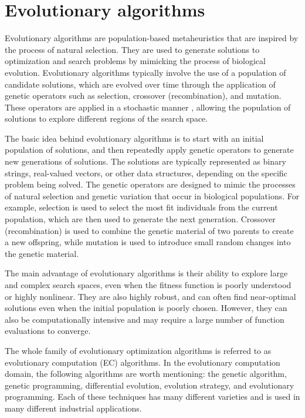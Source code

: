 \documentclass[oneside]{ctuthesis}
\theoremstyle{plain}
\theoremstyle{definition}
\theoremstyle{note}
\begin{document}
\chapter{Evolutionary algorithms}

Evolutionary algorithms are population-based metaheuristics that are inspired by the process of natural selection. They are used to generate solutions to optimization and search problems by mimicking the process of biological evolution. Evolutionary algorithms typically involve the use of a population of candidate solutions, which are evolved over time through the application of genetic operators such as selection, crossover (recombination), and mutation. These operators are applied in a stochastic manner , allowing the population of solutions to explore different regions of the search space.

The basic idea behind evolutionary algorithms is to start with an initial population of solutions, and then repeatedly apply genetic operators to generate new generations of solutions. The solutions are typically represented as binary strings, real-valued vectors, or other data structures, depending on the specific problem being solved. The genetic operators are designed to mimic the processes of natural selection and genetic variation that occur in biological populations. For example, selection is used to select the most fit individuals from the current population, which are then used to generate the next generation. Crossover (recombination) is used to combine the genetic material of two parents to create a new offspring, while mutation is used to introduce small random changes into the genetic material.

The main advantage of evolutionary algorithms is their ability to explore large and complex search spaces, even when the fitness function is poorly understood or highly nonlinear. They are also highly robust, and can often find near-optimal solutions even when the initial population is poorly chosen. However, they can also be computationally intensive and may require a large number of function evaluations to converge.

The whole family of evolutionary optimization algorithms is referred to as evolutionary computation (EC) algorithms. In the evolutionary computation domain, the following algorithms are worth mentioning: the genetic algorithm, genetic programming, differential evolution, evolution strategy, and evolutionary programming. Each of these techniques has many different varieties and is used in many different industrial applications.
\end{document}
